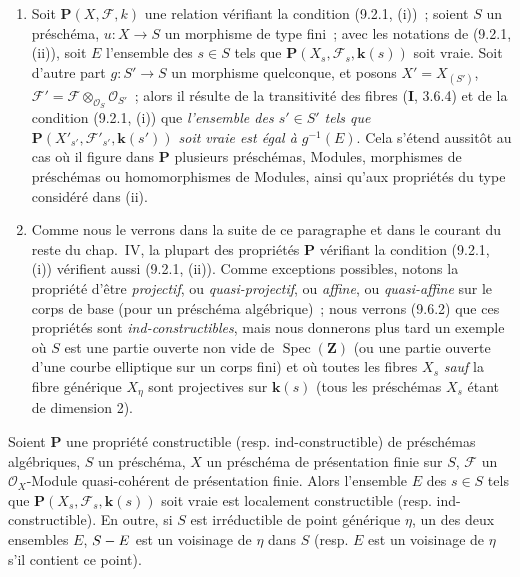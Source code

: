 \begin{remarks}[9.2.2]
\begin{enumerate}[label=(\roman*)]
  \item Soit $\boldsymbol{P}(X,\mathcal F,k)$ une relation vérifiant la condition
  (9.2.1, (i))~; soient $S$ un préschéma, $u:X\to S$ un morphisme de type
  fini~; avec les notations de (9.2.1, (ii)), soit $E$ l'ensemble des $s\in S$
  tels que $\boldsymbol{P}(X_s,\mathcal F_s,\boldsymbol{k}(s))$ soit vraie. Soit d'autre part
  $g:S'\to S$ un morphisme quelconque, et posons
  $X'=X_{(S')}$, $\mathcal F'=\mathcal F\otimes_{\mathcal O_S}\mathcal O_{S'}$~;
  alors il résulte de la transitivité des fibres (\textbf{I}, 3.6.4) et de la condition
  (9.2.1, (i)) que \emph{l'ensemble des $s'\in S'$ tels que
  $\boldsymbol{P}(X'_{s'},\mathcal F'_{s'},\boldsymbol{k}(s'))$ soit vraie est égal à
  $g^{-1}(E)$}. Cela s'étend aussitôt au cas où il figure dans $\boldsymbol{P}$
  plusieurs préschémas, Modules, morphismes de préschémas ou homomorphismes de
  Modules, ainsi qu'aux propriétés du type considéré dans (ii).

  \item Comme nous le verrons dans la suite de ce paragraphe et dans le courant
  du reste du chap.~IV, la plupart des propriétés $\boldsymbol{P}$ vérifiant la
  condition (9.2.1, (i)) vérifient aussi (9.2.1, (ii)). Comme exceptions
  possibles, notons la propriété d'être \emph{projectif}, ou
  \emph{quasi-projectif}, ou \emph{affine}, ou \emph{quasi-affine} sur le
  corps de base (pour un préschéma algébrique)~; nous verrons (9.6.2) que ces
  propriétés sont \emph{ind-constructibles}, mais nous donnerons plus tard un
  exemple où $S$ est une partie ouverte non vide de $\operatorname{Spec}(\mathbf Z)$
  (ou une partie ouverte d'une courbe elliptique sur un corps fini) et où
  toutes les fibres $X_s$
  \emph{sauf} la fibre générique $X_\eta$ sont projectives sur $\boldsymbol{k}(s)$ (tous les
  préschémas $X_s$ étant de dimension 2).
\end{enumerate}
\end{remarks}

\begin{proposition}[9.2.3]
\label{IV.9.2.3-fr}
Soient $\boldsymbol{P}$ une propriété constructible (\textup{resp.} ind-constructible) de
préschémas algébriques, $S$ un préschéma, $X$ un préschéma de présentation
finie sur $S$, $\mathcal F$ un $\mathcal O_X$-Module quasi-cohérent de
présentation finie. Alors l'ensemble $E$ des $s\in S$ tels que
$\boldsymbol{P}(X_s,\mathcal F_s,\boldsymbol{k}(s))$ soit vraie est localement constructible
(\textup{resp.} ind-constructible). En outre, si $S$ est irréductible de point générique
$\eta$, un des deux ensembles $E$, $S- E$ est un voisinage de $\eta$ dans $S$
(\textup{resp.} $E$ est un voisinage de $\eta$ s'il contient ce point).
\end{proposition}

